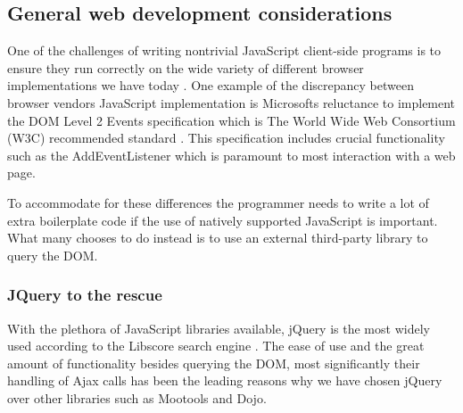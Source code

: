 \documentclass[english]{ifimaster}
\begin{document}

%



\subsection{General web development considerations}
One of the challenges of writing nontrivial JavaScript client-side programs is to ensure they run correctly on the wide variety of different browser implementations we have today \parencite[p. 325]{flanagan}. One example of the discrepancy between browser vendors JavaScript implementation is Microsofts reluctance to implement the DOM Level 2 Events specification which is The World Wide Web Consortium (W3C) recommended standard \parencite{w3c}. This specification includes crucial functionality such as the AddEventListener which is paramount to most interaction with a web page. 

To accommodate for these differences the programmer needs to write a lot of extra boilerplate code if the use of natively supported JavaScript is important. What many chooses to do instead is to use an external third-party library to query the DOM. 

\subsubsection{JQuery to the rescue}
With the plethora of JavaScript libraries available, jQuery is the most widely used according to the Libscore search engine \parencite{infoWorld}. The ease of use and the great amount of functionality besides querying the DOM, most significantly their handling of Ajax calls has been the leading reasons why we have chosen jQuery over other libraries such as Mootools and Dojo. 
\end{document}
